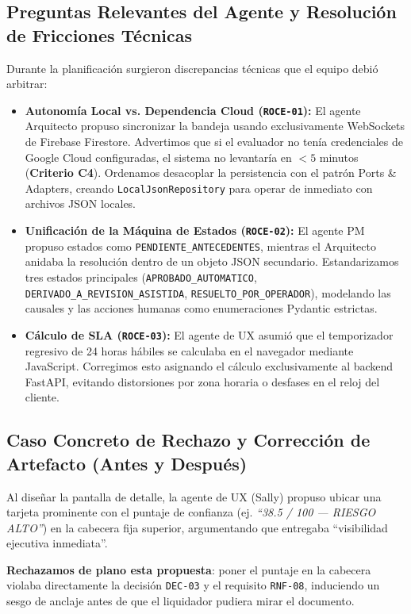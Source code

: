 \documentclass[11pt,letterpaper]{article}
\begin{document}
\subsection{Preguntas Relevantes del Agente y Resolución de Fricciones Técnicas}
Durante la planificación surgieron discrepancias técnicas que el equipo debió arbitrar:
\begin{itemize}
    \item \textbf{Autonomía Local vs. Dependencia Cloud (\texttt{ROCE-01}):} El agente Arquitecto propuso sincronizar la bandeja usando exclusivamente WebSockets de Firebase Firestore. Advertimos que si el evaluador no tenía credenciales de Google Cloud configuradas, el sistema no levantaría en $<5$ minutos (\textbf{Criterio C4}). Ordenamos desacoplar la persistencia con el patrón Ports \& Adapters, creando \texttt{LocalJsonRepository} para operar de inmediato con archivos JSON locales.
    \item \textbf{Unificación de la Máquina de Estados (\texttt{ROCE-02}):} El agente PM propuso estados como \texttt{PENDIENTE\_ANTECEDENTES}, mientras el Arquitecto anidaba la resolución dentro de un objeto JSON secundario. Estandarizamos tres estados principales (\texttt{APROBADO\_AUTOMATICO}, \texttt{DERIVADO\_A\_REVISION\_ASISTIDA}, \texttt{RESUELTO\_POR\_OPERADOR}), modelando las causales y las acciones humanas como enumeraciones Pydantic estrictas.
    \item \textbf{Cálculo de SLA (\texttt{ROCE-03}):} El agente de UX asumió que el temporizador regresivo de 24 horas hábiles se calculaba en el navegador mediante JavaScript. Corregimos esto asignando el cálculo exclusivamente al backend FastAPI, evitando distorsiones por zona horaria o desfases en el reloj del cliente.
\end{itemize}

\subsection{Caso Concreto de Rechazo y Corrección de Artefacto (Antes y Después)}
Al diseñar la pantalla de detalle, la agente de UX (Sally) propuso ubicar una tarjeta prominente con el puntaje de confianza (ej. \textit{``38.5 / 100 — RIESGO ALTO''}) en la cabecera fija superior, argumentando que entregaba ``visibilidad ejecutiva inmediata''. 

\textbf{Rechazamos de plano esta propuesta}: poner el puntaje en la cabecera violaba directamente la decisión \texttt{DEC-03} y el requisito \texttt{RNF-08}, induciendo un sesgo de anclaje antes de que el liquidador pudiera mirar el documento.
\end{document}
